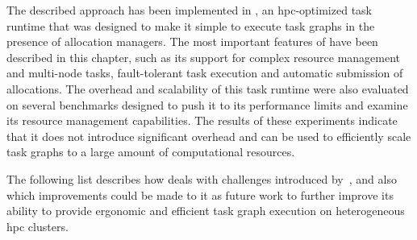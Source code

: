 The described approach has been implemented in \hyperqueue{}, an
\gls{hpc}-optimized task runtime that was designed to make it simple to execute
task graphs in the presence of allocation managers. The most important features of
\hyperqueue{} have been described in this chapter, such as its support for complex
resource management and multi-node tasks, fault-tolerant task execution and automatic submission of
allocations. The overhead and scalability of this task runtime were also evaluated on several
benchmarks designed to push it to its performance limits and examine its resource management capabilities.
The results of these experiments indicate that it does not introduce significant overhead and can be used
to efficiently scale task graphs to a large amount of computational resources.

The following list describes how \hyperqueue{} deals with challenges
introduced by~, and also which improvements could be made to it as future
work to further improve its ability to provide ergonomic and efficient task graph execution on
heterogeneous \gls{hpc} clusters.
